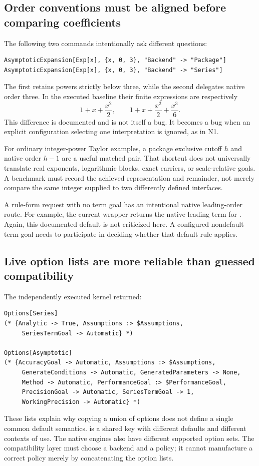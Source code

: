 \documentclass[11pt,a4paper]{article}
\newcommand{\code}[1]{\texttt{\detokenize{#1}}}
\begin{document}
\subsection{Order conventions must be aligned before comparing coefficients}

The following two commands intentionally ask different questions:
\begin{lstlisting}
AsymptoticExpansion[Exp[x], {x, 0, 3}, "Backend" -> "Package"]
AsymptoticExpansion[Exp[x], {x, 0, 3}, "Backend" -> "Series"]
\end{lstlisting}
The first retains powers strictly below three, while the second delegates native order three. In the executed baseline their finite expressions are respectively
\[
 1+x+\frac{x^2}{2},\qquad
 1+x+\frac{x^2}{2}+\frac{x^3}{6}.
\]
This difference is documented and is not itself a bug. It becomes a bug when an explicit configuration selecting one interpretation is ignored, as in N1.

For ordinary integer-power Taylor examples, a package exclusive cutoff \(h\) and native \code{Series} order \(h-1\) are a useful matched pair. That shortcut does not universally translate real exponents, logarithmic blocks, exact carriers, or scale-relative goals. A benchmark must record the achieved representation and remainder, not merely compare the same integer supplied to two differently defined interfaces.

A rule-form request with no term goal has an intentional native leading-order route. For example, the current wrapper returns the native leading term for \code{Sin[x], x -> 0}. Again, this documented default is not criticized here. A configured nondefault term goal needs to participate in deciding whether that default rule applies.

\subsection{Live option lists are more reliable than guessed compatibility}

The independently executed kernel returned:
\begin{lstlisting}
Options[Series]
(* {Analytic -> True, Assumptions :> $Assumptions,
     SeriesTermGoal -> Automatic} *)

Options[Asymptotic]
(* {AccuracyGoal -> Automatic, Assumptions :> $Assumptions,
     GenerateConditions -> Automatic, GeneratedParameters -> None,
     Method -> Automatic, PerformanceGoal :> $PerformanceGoal,
     PrecisionGoal -> Automatic, SeriesTermGoal -> 1,
     WorkingPrecision -> Automatic} *)
\end{lstlisting}
These lists explain why copying a union of options does not define a single common default semantics. \code{SeriesTermGoal} is a shared key with different defaults and different contexts of use. The native engines also have different supported option sets. The compatibility layer must choose a backend and a policy; it cannot manufacture a correct policy merely by concatenating the option lists.
\end{document}
